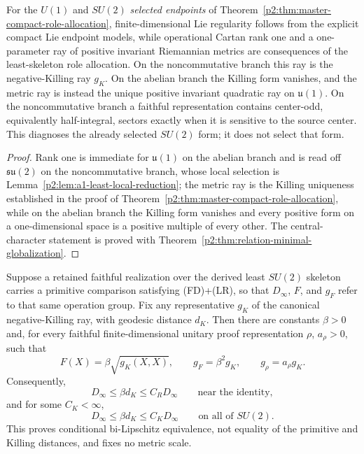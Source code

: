 \documentclass[12pt,a4paper]{article}
\begin{document}
\begin{corollary}
\label{p2:cor:rank-center-diagnostics}
For the \(U(1)\) and \(SU(2)\) \emph{selected endpoints} of
Theorem~\ref{p2:thm:master-compact-role-allocation}, finite-dimensional Lie
regularity follows from the explicit compact Lie endpoint models, while
operational Cartan rank one and a one-parameter ray of positive invariant
Riemannian metrics are consequences of the least-skeleton role allocation.  On the noncommutative branch
this ray is the negative-Killing ray \(g_K\).  On the abelian branch the
Killing form vanishes, and the metric ray is instead the unique positive
invariant quadratic ray on \(\mathfrak u(1)\).  On the noncommutative branch a
faithful representation contains center-odd, equivalently half-integral,
sectors exactly when it is sensitive to the source center.  This diagnoses
the already selected \(SU(2)\) form; it does not select that form.
\end{corollary}

\begin{proof}
Rank one is immediate for \(\mathfrak u(1)\) on the abelian branch and
is read off \(\mathfrak{su}(2)\) on the noncommutative branch, whose local
selection is Lemma~\ref{p2:lem:a1-least-local-reduction}; the metric ray is the Killing
uniqueness established in the proof of
Theorem~\ref{p2:thm:master-compact-role-allocation}, while on the abelian
branch the Killing form vanishes and every positive form on a one-dimensional
space is a positive multiple of every other.  The central-character statement
is proved with
Theorem~\ref{p2:thm:relation-minimal-globalization}.
\end{proof}

\begin{corollary}
\label{p2:cor:primitive-killing-metric-comparison}
Suppose a retained faithful realization over the derived least \(SU(2)\)
skeleton carries a primitive comparison satisfying (FD)+(LR), so that
\(D_\infty\), \(F\), and \(g_F\) refer to that same operation group.  Fix any representative \(g_K\) of the
canonical negative-Killing ray, with geodesic distance \(d_K\).  Then there
are constants \(\beta>0\) and, for every faithful finite-dimensional unitary
proof representation \(\rho\), \(a_\rho>0\), such that
\[
 F(X)=\beta\sqrt{g_K(X,X)},\qquad
 g_F=\beta^2g_K,\qquad
 g_\rho=a_\rho g_K.
\]
Consequently,
\[
 D_\infty\le\beta d_K\le C_R D_\infty
 \qquad\text{near the identity},
\]
and for some \(C_K<\infty\),
\[
 D_\infty\le\beta d_K\le C_KD_\infty
 \qquad\text{on all of \(SU(2)\)}.
\]
This proves conditional bi-Lipschitz equivalence, not equality of the
primitive and Killing distances, and fixes no metric scale.
\end{corollary}
\end{document}
